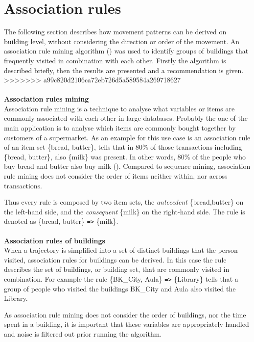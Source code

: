\section{Association rules} 
The following section describes how movement patterns can be derived on building level, without considering the direction or order of the movement. An association rule mining algorithm (\cite{agrawal_mining_1993}) was used to identify groups of buildings that frequently visited in combination with each
other. Firstly the algorithm is described briefly, then the results are presented and a recommendation is given.
>>>>>>> a99c820d2106ca72eb726d5a589584a269718627
\\\\
\textbf{Association rules mining}\\
Association rule mining is a technique to analyse what variables or items are
commonly associated with each other in large databases. Probably the one of the
main application is to analyse which items are commonly bought together by
customers of a supermarket. As an example for this use case is an association
rule of an item set \{bread, butter\}, tells that in 80\% of those transactions
including \{bread, butter\}, also \{milk\}  was present. In other words, 80\%
of the people who buy bread and butter also buy milk
(\cite{agrawal_mining_1993}). Compared to sequence mining, association rule
mining does not consider the order of items neither within, nor across transactions.

Thus every rule is composed by two item sets, the \textit{antecedent}
\{bread,butter\} on the left-hand side, and the \textit{consequent} \{milk\} on
the right-hand side. The rule is denoted as \{bread, butter\} \verb|=>| \{milk\}.
\\\\
\textbf{Association rules of buildings}\\
When a trajectory is simplified into a set of distinct buildings that the person
visited, association rules for buildings can be derived. In this case the rule
describes the set of buildings, or building set, that are commonly visited in
combination. For example the rule \{BK\_City, Aula\} \verb|=>| \{Library\}
tells that a group of people who visited the buildings BK\_City and Aula also
visited the Library.

As association rule mining does not consider the order of buildings, nor the
time spent in a building, it is important that these variables are appropriately
handled and noise is filtered out prior running the algorithm.


